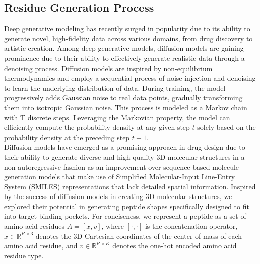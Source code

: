\subsection{Residue Generation Process}
Deep generative modeling has recently surged in popularity due to its ability to generate novel, high-fidelity data across various domains, from drug discovery to artistic creation. Among deep generative models, diffusion models are gaining prominence due to their ability to effectively generate realistic data through a denoising process. Diffusion models are inspired by non-equilibrium thermodynamics \cite{sohl2015deep, ho2020denoising} and employ a sequential process of noise injection and denoising to learn the underlying distribution of data. During training, the model progressively adds Gaussian noise to real data points, gradually transforming them into isotropic Gaussian noise. This process is modeled as a Markov chain with T discrete steps. Leveraging the Markovian property, the model can efficiently compute the probability density at any given step $t$ solely based on the probability density at the preceding step $t-1$. \\

Diffusion models have emerged as a promising approach in drug design due to their ability to generate diverse and high-quality 3D molecular structures in a non-autoregressive fashion \cite{du2022molgensurvey} as an improvement over sequence-based molecule generation models that make use of Simplified Molecular-Input Line-Entry System (SMILES) \cite{weininger1988smiles} representations that lack detailed spatial information. Inspired by the success of diffusion models in creating 3D molecular structures, we explored their potential in generating peptide shapes specifically designed to fit into target binding pockets. For conciseness, we represent a peptide as a set of amino acid residues $A = [x, v]$, where $[\cdot, \cdot]$ is the concatenation operator, $x \in \mathbb{R}^{R \times 3}$ denotes the 3D Cartesian coordinates of the center-of-mass of each amino acid residue, and $v \in \mathbb{R}^{R \times K}$ denotes the one-hot encoded amino acid residue type. \\

